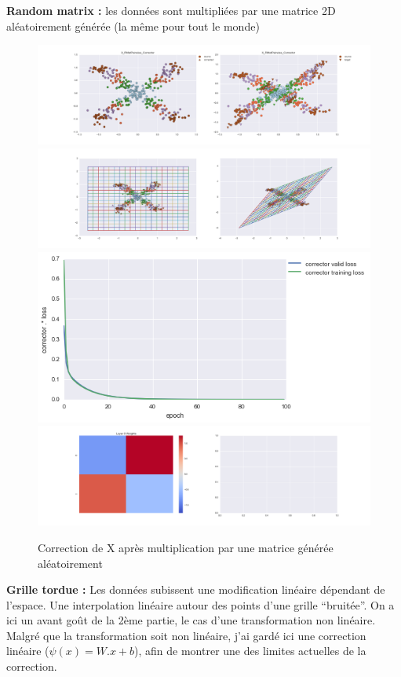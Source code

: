 {\Large \textbf{Random matrix :}} les données sont multipliées par une matrice 2D aléatoirement générée
 (la même pour tout le monde)

\begin{figure}[H] %
\centering
\includegraphics[width=\linewidth]{fig/24-05-2016/X/X_RMatPairwise_Corrector-DATA.png}
\includegraphics[width=\linewidth]{fig/24-05-2016/X/X_RMatPairwise_Corrector-GridCheck.png}
\includegraphics[width=0.45\linewidth]{fig/24-05-2016/X/X_RMatPairwise_Corrector-Learning_curve.png}
\includegraphics[width=\linewidth]{fig/24-05-2016/X/X_RMatPairwise_Corrector-W.png}
\caption{Correction de X après multiplication par une matrice générée aléatoirement}
\label{fig:recap-X-RMat-pairwise}
\end{figure}


{\Large \textbf{Grille tordue :}} Les données subissent une modification linéaire dépendant de l'espace.
Une interpolation linéaire autour des points d'une grille ``bruitée''.
On a ici un avant goût de la 2ème partie, le cas d'une transformation non linéaire.
Malgré que la transformation soit non linéaire, j'ai gardé ici une correction linéaire ($\psi(x) = W.x+b$),
afin de montrer une des limites actuelles de la correction.

